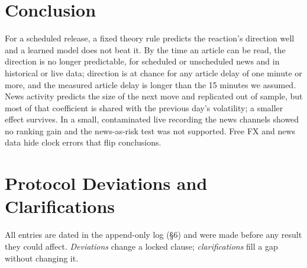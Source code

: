 \documentclass[conference]{IEEEtran}
\begin{document}
\section{Conclusion}
For a scheduled release, a fixed theory rule predicts the reaction's direction well and a learned
model does not beat it. By the time an article can be read, the direction is no longer
predictable, for scheduled or unscheduled news and in historical or live data; direction is at
chance for any article delay of one minute or more, and the measured article delay is longer than
the 15 minutes we assumed. News activity predicts the size of the next move and replicated out of
sample, but most of that coefficient is shared with the previous day's volatility; a smaller
effect survives. In a small, contaminated live recording the news channels
showed no ranking gain and the news-as-risk test was not supported. Free FX and news data hide
clock errors that flip conclusions.

\appendices
\section{Protocol Deviations and Clarifications}\label{app:dev}
All entries are dated in the append-only log (\S6) and were made before any result they could
affect. \emph{Deviations} change a locked clause; \emph{clarifications} fill a gap without
changing it.
\end{document}
